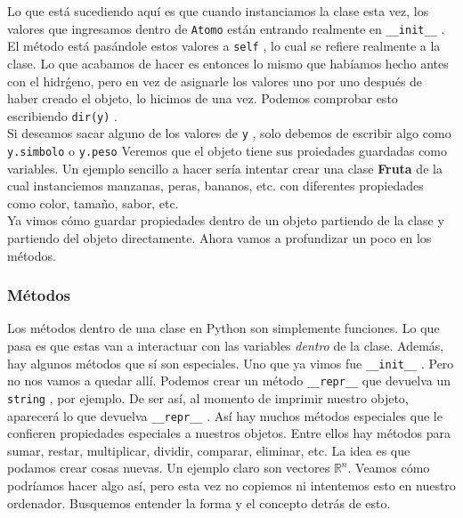 \documentclass[10pt,letterpaper]{article}
\newcommand{\inlinecode}[1]{
\colorbox{light-gray}{\texttt{#1}}
}
\begin{document}
Lo que est\'a sucediendo aqu\'i es que cuando instanciamos la clase esta vez, los valores que ingresamos dentro de \inlinecode{Atomo} est\'an entrando realmente en \inlinecode{\_\_init\_\_}. El m\'etodo est\'a pas\'andole estos valores a \inlinecode{self}, lo cual se refiere realmente a la clase. Lo que acabamos de hacer es entonces lo mismo que hab\'iamos hecho antes con el hidr\'geno, pero en vez de asignarle los valores uno por uno despu\'es de haber creado el objeto, lo hicimos de una vez. Podemos comprobar esto escribiendo \inlinecode{dir(y)}.\\

Si deseamos sacar alguno de los valores de \inlinecode{y}, solo debemos de escribir algo como \inlinecode{y.simbolo} o \inlinecode{y.peso} Veremos que el objeto tiene sus proiedades guardadas como variables. Un ejemplo sencillo a hacer ser\'ia intentar crear una clase \textbf{Fruta} de la cual instanciemos manzanas, peras, bananos, etc. con diferentes propiedades como color, tama\~no, sabor, etc.\\

Ya vimos c\'omo guardar propiedades dentro de un objeto partiendo de la clase y partiendo del objeto directamente. Ahora vamos a profundizar un poco en los m\'etodos.

\subsubsection{M\'etodos}
Los m\'etodos dentro de una clase en Python son simplemente funciones. Lo que pasa es que estas van a interactuar con las variables \emph{dentro} de la clase. Adem\'as, hay algunos m\'etodos que s\'i son especiales. Uno que ya vimos fue \inlinecode{\_\_init\_\_}. Pero no nos vamos a quedar all\'i. Podemos crear un m\'etodo \inlinecode{\_\_repr\_\_} que devuelva un \inlinecode{string}, por ejemplo. De ser as\'i, al momento de imprimir nuestro objeto, aparecer\'a lo que devuelva \inlinecode{\_\_repr\_\_}. As\'i hay muchos m\'etodos especiales que le confieren propiedades especiales a nuestros objetos. Entre ellos hay m\'etodos para sumar, restar, multiplicar, dividir, comparar, eliminar, etc. La idea es que podamos crear cosas nuevas. Un ejemplo claro son vectores $\mathbb{R}^n$. Veamos c\'omo podr\'iamos hacer algo as\'i, pero esta vez no copiemos ni intentemos esto en nuestro ordenador. Busquemos entender la forma y el concepto detr\'as de esto.\\
\end{document}
